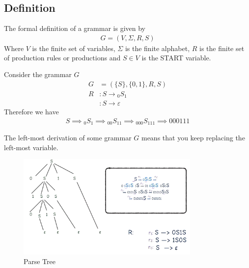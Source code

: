 \documentclass[a4paper]{article}
\theoremstyle{plain}
\theoremstyle{definition}
\newtheorem{defn}{Definition}[section]
\newtheorem{exmp}{Example}[section]
\theoremstyle{remark}
\begin{document}
\subsection{Definition}
\begin{tcolorbox}[colback=black!3!white,colframe=black!60!white,title=\begin{defn}Grammar \label{Grammar}\end{defn}]
The formal definition of a grammar is given by
\begin{align}
G = (V,\Sigma,R,S)
\end{align}
Where $V$ is the finite set of variables, $\Sigma$ is the finite alphabet, $R $ is the finite set of production rules or productions and $S \in V$ is the START variable.
\end{tcolorbox}
\begin{tcolorbox}[colback=black!3!white,colframe=black!60!white,title=\begin{exmp}Grammar Example \label{Grammar Example}\end{exmp}]
        Consider the grammar $G$
                \begin{align}
			G &= (\{S\},\{0,1\},R,S) \\
			R&: S \to {}_0S_1 \\
		   &: S \to \varepsilon
                \end{align}
		Therefore we have
		\begin{align}
			S \implies {}_0S_1 \implies {}_{00}S_{11} \implies {}_{000}S_{111} \implies 000111
		\end{align}
\end{tcolorbox}
\begin{tcolorbox}[colback=black!3!white,colframe=black!60!white,title=\begin{defn}Left-most Derivation \label{Left-most Derivation}\end{defn}]
The left-most derivation of some grammar $G$ means that you keep replacing the left-most variable.
\end{tcolorbox}
\begin{tcolorbox}[colback=black!3!white,colframe=black!60!white,title=\begin{defn}Parse Tree \label{Parse Tree}\end{defn}]
\begin{figure}[H]
	\centering
	\includegraphics[width=0.8\textwidth]{thirteen.png}
	\caption{Parse Tree}
	\label{fig:thirteen-png}
\end{figure}
\end{tcolorbox}
\end{document}
